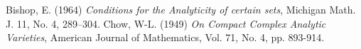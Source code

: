 \documentclass[letterpaper]{beamer}
\begin{document}
\begin{thebibliography}{3}
 Bishop, E. (1964) \textit{Conditions for the Analyticity  of certain sets}, Michigan Math. J. 11, No. 4, 289--304.
 Chow, W-L. (1949) \textit{On Compact Complex Analytic Varieties},
American Journal of Mathematics, Vol. 71, No. 4, pp. 893-914.

\end{thebibliography}
\end{document}
